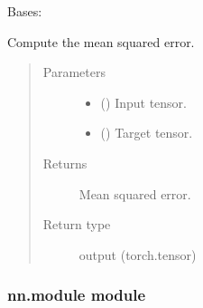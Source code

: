\documentclass[letterpaper,10pt,english,openany,oneside]{sphinxmanual}
\begin{document}

\begin{fulllineitems}
\label{\detokenize{nn:nn.loss.MSELoss}}
Bases: {\hyperref[\detokenize{nn:nn.loss.Loss}]{}}

\begin{fulllineitems}
\label{\detokenize{nn:nn.loss.MSELoss.forward}}
Compute the mean squared error.
\begin{quote}\begin{description}
\item[{Parameters}] \leavevmode\begin{itemize}
\item {} 
 () \textendash{} Input tensor.

\item {} 
 () \textendash{} Target tensor.

\end{itemize}

\item[{Returns}] \leavevmode
Mean squared error.

\item[{Return type}] \leavevmode
output (torch.tensor)

\end{description}\end{quote}

\end{fulllineitems}


\end{fulllineitems}



\subsubsection{nn.module module}
\label{\detokenize{nn:module-nn.module}}\label{\detokenize{nn:nn-module-module}}
\end{document}
